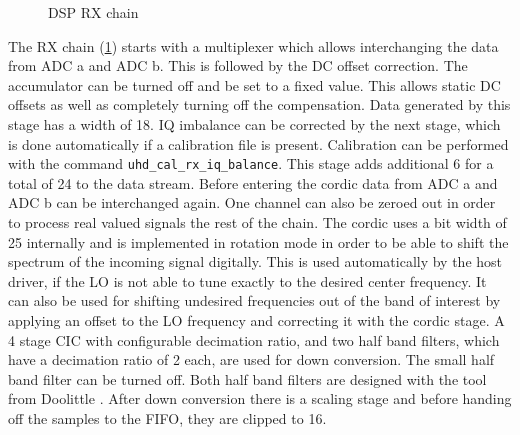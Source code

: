 \documentclass[12pt,a4paper,parskip=full]{scrartcl}
\begin{document}
\begin{figure}[htb]
{}
    \caption{DSP RX chain}
    \label{fig:rxpath}
\end{figure}
The RX chain (\cref{fig:rxpath}) starts with a multiplexer which allows
interchanging the data from ADC a and ADC b. This is followed by the DC offset correction.
The accumulator can be turned off and be set to a fixed value.
This allows static DC offsets as well as completely turning off the compensation. Data 
generated by this stage has a width of \SI{18}{\bit}. IQ imbalance can be corrected by the
next stage, which is done automatically if a calibration file is present. Calibration can be
performed with the command \verb+uhd_cal_rx_iq_balance+\cite{usrp_cal}. This stage adds additional
\SI{6}{\bit} for a total of \SI{24}{\bit} to the data stream. Before entering the cordic data from
ADC a and ADC b can be interchanged again. One channel can also be zeroed out in order to process
real valued signals the rest of the chain. The cordic uses a bit width of \SI{25}{\bit} internally and is
implemented in rotation mode in order to be able to shift the spectrum of the incoming signal
digitally. This is used automatically by the host driver, if the LO is not able to tune exactly
to the desired center frequency. It can also be used for shifting undesired frequencies out of
the band of interest by applying an offset to the LO frequency and correcting it with the
cordic stage. A 4 stage CIC with configurable decimation ratio, and two half band filters, which
have a decimation ratio of 2 each, are used for down conversion. The small half band filter can
be turned off. Both half band filters are designed with the tool from Doolittle \cite{halfband}.
After down conversion there is a scaling stage and before handing off the samples to the FIFO,
they are clipped to \SI{16}{\bit}.
\end{document}
